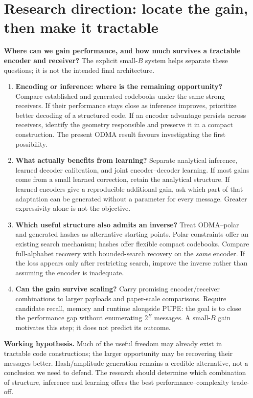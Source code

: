 \documentclass[10pt,a4paper]{article}
\begin{document}
\section{Research direction: locate the gain, then make it tractable}
\textbf{Where can we gain performance, and how much survives a tractable encoder and receiver?}
The explicit small-$B$ system helps separate these questions; it is not the intended final architecture.
\begin{enumerate}
 \item \textbf{Encoding or inference: where is the remaining opportunity?} Compare established and generated
 codebooks under the same strong receivers. If their performance stays close as inference improves, prioritize better
 decoding of a structured code. If an encoder advantage persists across receivers, identify the geometry responsible
 and preserve it in a compact construction. The present ODMA result favours investigating the first possibility.
 \item \textbf{What actually benefits from learning?} Separate analytical inference, learned decoder calibration,
 and joint encoder--decoder learning. If most gains come from a small learned correction, retain the analytical
 structure. If learned encoders give a reproducible additional gain, ask which part of that adaptation can be generated
 without a parameter for every message. Greater expressivity alone is not the objective.
 \item \textbf{Which useful structure also admits an inverse?} Treat ODMA--polar and generated hashes as alternative
 starting points. Polar constraints offer an existing search mechanism; hashes offer flexible compact codebooks.
 Compare full-alphabet recovery with bounded-search recovery on the \emph{same} encoder. If the loss appears only
 after restricting search, improve the inverse rather than assuming the encoder is inadequate.
 \item \textbf{Can the gain survive scaling?} Carry promising encoder/receiver combinations to larger payloads and
 paper-scale comparisons. Require candidate recall, memory and runtime alongside PUPE: the goal is to close the
 performance gap without enumerating $2^B$ messages. A small-$B$ gain motivates this step; it does not predict its outcome.
\end{enumerate}
\textbf{Working hypothesis.} Much of the useful freedom may already exist in tractable code constructions; the larger
opportunity may be recovering their messages better. Hash/amplitude generation remains a credible alternative, not
a conclusion we need to defend. The research should determine which combination of structure, inference and learning
offers the best performance--complexity trade-off.
\end{document}
